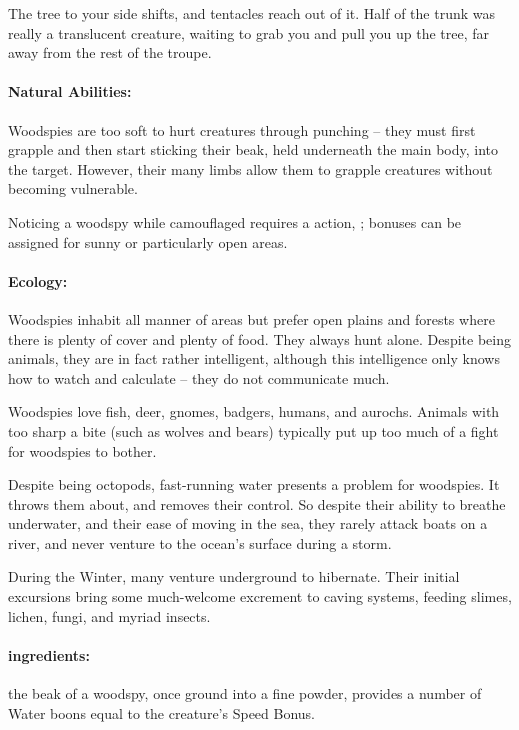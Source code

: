 \begin{multicols}{2}
\begin{boxtext}

  The tree to your side shifts, and tentacles reach out of it.
  Half of the trunk was really a translucent creature, waiting to grab you and pull you up the tree, far away from the rest of the troupe.

\end{boxtext}

\paragraph{Natural Abilities:} Woodspies are too soft to hurt creatures through punching -- they must first grapple and then start sticking their beak, held underneath the main body, into the target.
However, their many limbs allow them to grapple creatures without becoming vulnerable.%

Noticing a woodspy while camouflaged requires a  action, \tn[14]; bonuses can be assigned for sunny or particularly open areas.

\woodspy

\paragraph{Ecology:} Woodspies inhabit all manner of areas but prefer open plains and forests where there is plenty of cover and plenty of food.  They always hunt alone.  Despite being animals, they are in fact rather intelligent, although this intelligence only knows how to watch and calculate -- they do not communicate much.

Woodspies love fish, deer, gnomes, badgers, humans, and aurochs.
Animals with too sharp a bite (such as wolves and bears) typically put up too much of a fight for woodspies to bother.

Despite being octopods, fast-running water presents a problem for woodspies.
It throws them about, and removes their control.
So despite their ability to breathe underwater, and their ease of moving in the sea, they rarely attack boats on a river, and never venture to the ocean's surface during a storm.

During the Winter, many venture underground to hibernate.
Their initial excursions bring some much-welcome excrement to caving systems, feeding slimes, lichen, fungi, and myriad insects.

\paragraph{\Glspl{ingredient}:}
the beak of a woodspy, once ground into a fine powder, provides a number of Water \glspl{boon} equal to the creature's Speed Bonus.


\end{multicols}
